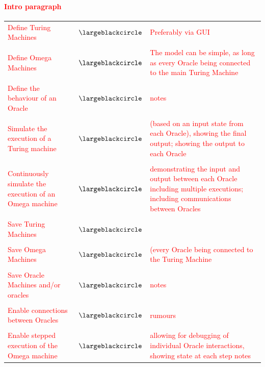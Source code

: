 \documentclass[12pt,a4,xcolor=table]{article}
\begin{document}
	\textcolor{red}{
		\paragraph{Intro paragraph}
	\newpage\begin{table}[h!]
		\centering
		\begin{tabular}{m{3in} m{0.5in} m{2.5in}}
			Define Turing Machines & \textcolor{BrickRed}{$\largeblackcircle$} & Preferably via GUI\\\\
			Define Omega Machines & \textcolor{BrickRed}{$\largeblackcircle$} & The model can be simple, as long as every Oracle being connected to the main Turing Machine \\\\
			Define the behaviour of an Oracle & \textcolor{BrickRed}{$\largeblackcircle$} & notes \\\\
			Simulate the execution of a Turing machine& \textcolor{BrickRed}{$\largeblackcircle$} & (based on an input state from each Oracle), showing the final output; showing the output to each Oracle\\\\
			Continuously simulate the execution of an Omega machine & \textcolor{BrickRed}{$\largeblackcircle$} & demonstrating the input and output between each Oracle including multiple executions; including communications between Oracles\\\\
			Save Turing Machines & \textcolor{Dandelion}{$\largeblackcircle$} \\\\
			Save Omega Machines & \textcolor{Dandelion}{$\largeblackcircle$} &  (every Oracle being connected to the Turing Machine \\\\
			Save Oracle Machines and/or oracles & \textcolor{Dandelion}{$\largeblackcircle$} & notes \\\\
			Enable connections between Oracles & \textcolor{Dandelion}{$\largeblackcircle$} & rumours \\\\
			Enable stepped execution of the Omega machine& \textcolor{YellowGreen}{$\largeblackcircle$} & allowing for debugging of individual Oracle interactions, showing state at each step  notes
		\end{tabular}
	\end{table}
	}
\end{document}
